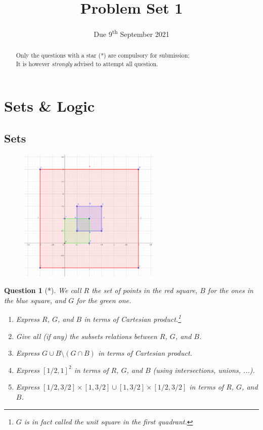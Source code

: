 \documentclass[]{article}
\title{Problem Set 1}
\author{}
\date{Due 9\textsuperscript{th} September 2021}
\newtheorem{question}{Question}
\begin{document}
\maketitle

\begin{abstract}
	Only the questions with a star (*) are compulsory for submission;\\
	It is however \textit{strongly} advised to attempt all question.
\end{abstract}

\section{Sets \& Logic}
\subsection{Sets}

\begin{figure}[h!]
	\centering
	\includegraphics[width=0.6\textwidth]{1-sets.png}
\end{figure}
\begin{question}[*]
	We call $R$ the set of points in the red square, $B$ for the ones in the blue square, and $G$ for the green one.
	\begin{enumerate}[label=\alph*.]
		\item Express $R$, $G$, and $B$ in terms of Cartesian product.\footnote{$G$ is in fact called the unit square in the first quadrant.}
		\item Give all (if any) the subsets relations between $R$, $G$, and $B$.
		\item Express $G \cup B \setminus (G \cap B)$ in terms of Cartesian product.
		\item Express $\left[ 1/2,1 \right]^2$ in terms of $R$, $G$, and $B$ (using intersections, unions, ...).
		\item Express $\left[ 1/2,3/2 \right] \times \left[ 1,3/2 \right] \cup \left[ 1,3/2 \right] \times \left[ 1/2,3/2 \right]$ in terms of $R$, $G$, and $B$.
	\end{enumerate}
\end{question}
\end{document}
